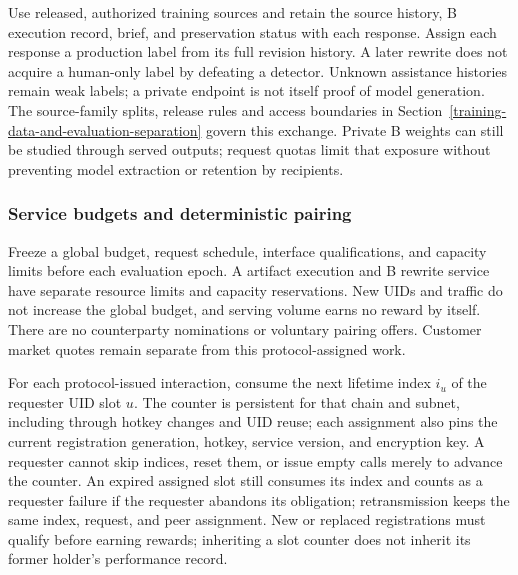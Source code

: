 Use released, authorized training sources and retain the source history,
B execution record, brief, and preservation status with each response.
Assign each response a production label from its full revision history.
A later rewrite does not acquire a human-only label by defeating a detector.
Unknown assistance histories remain weak labels; a private endpoint is
not itself proof of model generation.
The source-family splits, release rules and access boundaries in
Section~\ref{training-data-and-evaluation-separation} govern this exchange.
Private B weights can still be studied through served outputs;
request quotas limit that exposure without preventing model extraction
or retention by recipients.

\subsubsection{Service budgets and deterministic pairing}

Freeze a global budget, request schedule, interface qualifications, and
capacity limits before each evaluation epoch. A artifact execution and B
rewrite service have separate resource limits and capacity reservations. New UIDs
and traffic do not increase the global budget, and serving volume earns
no reward by itself. There are no counterparty nominations or voluntary
pairing offers. Customer market quotes remain separate from this
protocol-assigned work.

For each protocol-issued interaction, consume the next lifetime index
\(i_u\) of the requester UID slot \(u\). The counter is persistent for
that chain and subnet, including through hotkey changes and UID reuse;
each assignment also pins the current registration generation, hotkey,
service version, and encryption key. A requester cannot skip indices,
reset them, or issue empty calls merely to advance the counter. An
expired assigned slot still consumes its index and counts as a requester
failure if the requester abandons its obligation; retransmission keeps the
same index, request, and peer assignment. New or replaced registrations
must qualify before earning rewards; inheriting a slot counter does not
inherit its former holder's performance record.

